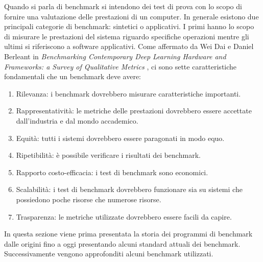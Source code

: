 \documentclass[12pt, a4paper]{report}
\begin{document}
Quando si parla di benchmark si intendono dei test di prova con lo scopo di fornire una valutazione delle prestazioni di un computer. In generale esistono due principali categorie di benchmark: sintetici o applicativi. I primi hanno lo scopo di misurare le prestazioni del sistema riguardo specifiche operazioni mentre gli ultimi si riferiscono a software applicativi. Come affermato da Wei Dai e Daniel Berleant in \textit{Benchmarking Contemporary Deep Learning Hardware and Frameworks: a Survey of Qualitative Metrics }, \cite{benchmarkIntro} ci sono sette caratteristiche fondamentali che un benchmark deve avere:
\begin{enumerate}
 \item Rilevanza: i benchmark dovrebbero misurare caratteristiche importanti.
 \item Rappresentatività: le metriche delle prestazioni dovrebbero essere accettate dall'industria e dal mondo accademico.
 \item Equità: tutti i sistemi dovrebbero essere paragonati in modo equo.
 \item Ripetibilità: è possibile verificare i risultati dei benchmark.
 \item Rapporto costo-efficacia: i test di benchmark sono economici.
 \item Scalabilità: i test di benchmark dovrebbero funzionare sia su sistemi che possiedono poche risorse che numerose risorse.
 \item Trasparenza: le metriche utilizzate dovrebbero essere facili da capire.
\end{enumerate}
In questa sezione viene prima presentata la storia dei programmi di benchmark dalle origini fino a oggi presentando alcuni standard attuali dei benchmark. Successivamente vengono approfonditi alcuni benchmark utilizzati.

 
\end{document}
